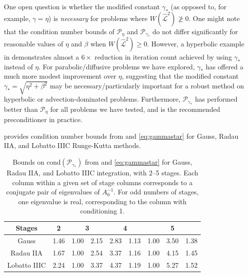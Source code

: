 \documentclass[review]{siamart}
\begin{document}
One open question is whether the modified constant $\gamma_*$ (as opposed to,
for example, $\gamma=\eta$) is \textit{necessary} for problems where
$W(\widehat{\mathcal{L}}^2) \not\geq 0$. One might note that the condition
number bounds of $\mathcal{P}_\eta$ and $\mathcal{P}_{\gamma_*}$ do not differ
significantly for reasonable values of $\eta$ and $\beta$ when
$W(\widehat{\mathcal{L}}^2) \geq 0$. However, a hyperbolic
example in  demonstrates almost a $6\times$ reduction
in iteration count achieved by using $\gamma_*$ instead of $\eta$. For
parabolic/diffusive problems we have explored, $\gamma_*$ has offered a much
more modest improvement over $\eta$, suggesting that the modified constant
$\gamma_*=\sqrt{\eta^2+\beta^2}$ may be necessary/particularly important
for a robust method on hyperbolic or advection-dominated problems.
Furthermore, $\mathcal{P}_{\gamma_*}$ has performed better than
$\mathcal{P}_{\eta}$ for all problems we have
tested, and is the recommended preconditioner in practice.

 provides condition number bounds from  and
\eqref{eq:gammastar} for Gauss, Radau IIA, and Lobatto IIIC Runge-Kutta methods.

%
{
\renewcommand{\tabcolsep}{4pt}
\renewcommand{\arraystretch}{1.15}
\begin{table}[!ht]
  \centering
  \begin{tabular}{| c | c | cc | cc | ccc |}  %
  \hline
Stages & 2 & \multicolumn{2}{c}{3} & \multicolumn{2}{|c}{4} & \multicolumn{3}{|c|}{5} \\\hline\hline
Gauss  & 1.46 & 1.00 & 2.15 & 2.83 & 1.13 & 1.00 & 3.50 & 1.38 \\
Radau IIA  & 1.67 & 1.00 & 2.54 & 3.37 & 1.16 & 1.00 & 4.15 & 1.45 \\
Lobatto IIIC  & 2.24 & 1.00 & 3.37 & 4.37 & 1.19 & 1.00 & 5.27 & 1.52 \\\hline
  \end{tabular}
  \caption{Bounds on cond$(\mathcal{P}_{\gamma_*})$ from  and
  \eqref{eq:gammastar} for Gauss, Radau IIA, and Lobatto IIIC integration,
  with 2--5 stages. Each column within a given set of stage columns corresponds
  to a conjugate pair of eigenvalues of $A_0^{-1}$. For odd numbers of stages,
  one eigenvalue is real, corresponding to the column with conditioning 1.}\label{tab:cond}
\end{table}

}
\end{document}
